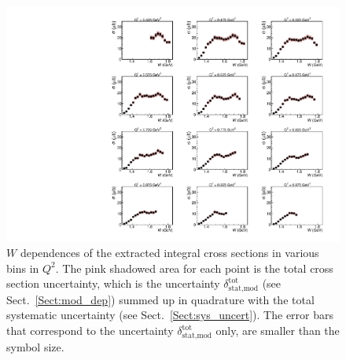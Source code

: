 \begin{figure}[htp]
\begin{center}
\includegraphics[width=\textwidth]{pictures/conclusion/wdep_20Jul2021.pdf}
\caption{\small $W$ dependences of the extracted integral cross sections in various bins in $Q^{2}$. The pink shadowed area for each point is the total cross section uncertainty, which is the uncertainty $\delta_{\text{stat,mod}}^{\text{tot}}$ (see Sect.~\ref{Sect:mod_dep}) summed up in quadrature with the total systematic uncertainty (see Sect.~\ref{Sect:sys_uncert}). The error bars that correspond to the uncertainty $\delta_{\text{stat,mod}}^{\text{tot}}$ only, are smaller than the symbol size.   } \label{fig:int_w_dep}
\end{center}
\end{figure}


